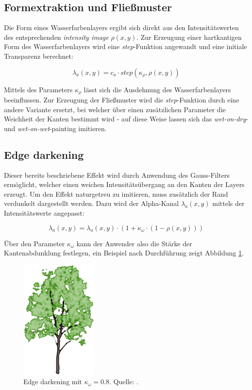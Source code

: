 \subsection{Formextraktion und Fließmuster}
Die Form eines Wasserfarbenlayers ergibt sich direkt aus den Intensitätswerten 
des entsprechenden \textsl{intensity image} $\rho(x, y)$. Zur Erzeugung einer 
hartkantigen Form des Wasserfarbenlayers wird eine \textsl{step}-Funktion 
angewandt und eine initiale Transparenz berechnet:

\[
\lambda_a(x,y) = c_a \cdot step(\kappa_\rho, \rho(x,y))
\]

Mittels des Parameters $\kappa_\rho$ lässt sich die Ausdehnung des 
Wasserfarbenlayers beeinflussen. Zur Erzeugung der Fließmuster wird die 
\textsl{step}-Funktion durch eine andere Variante ersetzt, bei welcher über 
einen zusätzlichen Parameter die Weichheit der Kanten bestimmt wird - auf diese 
Weise lassen sich das \textsl{wet-on-dry}- und \textsl{wet-on-wet}-painting 
imitieren.

\subsection{Edge darkening}
Dieser bereits beschriebene Effekt wird durch Anwendung des Gauss-Filters
ermöglicht, welcher einen weichen Intensitätsübergang an den Kanten der Layers
erzeugt. Um den Effekt naturgetreu zu imitieren, muss zusätzlich der Rand
verdunkelt dargestellt werden. Dazu wird der Alpha-Kanal $\lambda_a(x,y)$ mittels
der Intensitätswerte angepasst:

\[
\lambda_a(x,y) = \lambda_a(x,y) \cdot (1 + \kappa_\omega \cdot (1 - \rho(x,y)))
\]

Über den Parameter $\kappa_\omega$ kann der Anwender also die Stärke der
Kantenabdunklung festlegen, ein Beispiel nach Durchführung zeigt Abbildung
\ref{fig:tree-edge-darkening}.

\begin{figure}
  \centering
  \includegraphics[height=6cm]{../images/Luft2006-tree-edge-darkening}
  \caption{Edge darkening mit $\kappa_\omega = 0.8$. Quelle: \cite{Luft2006}.}
  \label{fig:tree-edge-darkening}
\end{figure}

